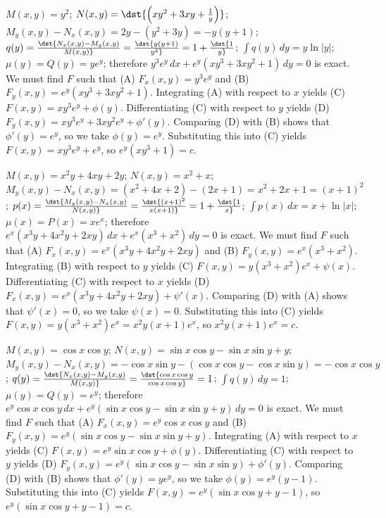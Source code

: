 \documentclass[dvips]{book}
\renewcommand{\exer}[1]{\par\medskip\;\noindent{\color{red}\bf #1.}}
\numberwithin{example}{section}
\numberwithin{equation}{section}
\numberwithin{theorem}{section}
\numberwithin{table}{section}
\numberwithin{figure}{section}
\begin{document}
\exer{2.6.10}
$M(x,y)=y^2$;\;
$N(x,y)= \dst{\left(xy^2+3xy+{1\over y}\right)}$;\;
$M_y(x,y)-N_x(x,y)=2y-(y^2+3y)=-y(y+1)$;\;
$q(y)=\dst{N_x(x,y)-M_y(x,y)\over M(x,y)}=\dst{y(y+1)\over y^2}=
1+\dst{1\over y}$;\;
$\int q(y)\,dy=y\ln|y|$;\;
$\mu(y)=Q(y)=ye^y$;
therefore
$y^3e^y\,dx+e^y(xy^3+3xy^2+1)\,dy=0$
is exact.
We must find $F$ such that
(A) $F_x(x,y)=y^3e^y$ and
(B) $F_y(x,y)=e^y(xy^3+3xy^2+1)$.
Integrating (A) with respect to $x$ yields
(C) $F(x,y)=xy^3e^y+\phi(y)$.
Differentiating (C) with respect to $y$  yields
(D) $F_y(x,y)=xy^3e^y+3xy^2e^y+\phi'(y)$.
Comparing (D) with (B)  shows that
$\phi'(y)=e^y$, so we take
$\phi(y)=e^y$.
Substituting this into (C) yields
$F(x,y)=xy^3e^y+e^y$,
so $e^y(xy^3+1)=c$.




\exer{2.6.12}
$M(x,y)=x^2y+4xy+2y$;\;
$N(x,y)=x^2+x$;\;
$M_y(x,y)-N_x(x,y)=(x^2+4x+2)-(2x+1)=x^2+2x+1=(x+1)^2$;\;
$p(x)=\dst{M_y(x,y)-N_x(x,y)\over N(x,y)}=\dst{(x+1)^2\over
x(x+1)}=1+\dst{1\over x}$;\;
$\int p(x)\,dx=x+\ln|x|$;\;
$\mu(x)=P(x)=xe^x$;
therefore
$e^x(x^3y+4x^2y+2xy)\,dx+e^x(x^3+x^2)\,dy=0$
is exact.
We must find $F$ such that
(A) $F_x(x,y)=e^x(x^3y+4x^2y+2xy)$ and
(B) $F_y(x,y)=e^x(x^3+x^2)$.
Integrating (B) with respect to $y$ yields
(C) $F(x,y)=y(x^3+x^2)e^x+\psi(x)$.
Differentiating (C) with respect to $x$  yields
(D) $F_x(x,y)=e^x(x^3y+4x^2y+2xy)+\psi'(x)$.
Comparing (D) with (A)  shows that
$\psi'(x)=0$, so we take
$\psi(x)=0$.
Substituting this into (C) yields
$F(x,y)=y(x^3+x^2)e^x=x^2y(x+1)e^x$,
so $x^2y(x+1)e^x=c$.



\exer{2.6.14}
$M(x,y)=\cos x\cos y$;\;
$N(x,y)=\sin x\cos y-\sin x\sin y+y$;\;
$M_y(x,y)-N_x(x,y)=-\cos x\sin y-(\cos x\cos y-\cos x\sin y)
=-\cos x\cos y$;\;
$q(y)=\dst{N_x(x,y)-M_y(x,y)\over M(x,y)}=\dst{\cos x\cos y
\over\cos x\cos y}=1$;\;
$\int q(y)\,dy=1$;\;
$\mu(y)=Q(y)=e^y$;
therefore
$e^y\cos x\cos y\,dx+e^y(\sin x\cos y-\sin x\sin y+y)\,dy=0$
is exact.
We must find $F$ such that
(A) $F_x(x,y)=e^y\cos x\cos y$ and
(B) $F_y(x,y)=e^y(\sin x\cos y-\sin x\sin y+y)$.
Integrating (A) with respect to $x$ yields
(C) $F(x,y)=e^y\sin x\cos y+\phi(y)$.
Differentiating (C) with respect to $y$  yields
(D) $F_y(x,y)=e^y(\sin x\cos y-\sin x\sin y)+\phi'(y)$.
Comparing (D) with (B)  shows that
$\phi'(y)=ye^y$, so we take
$\phi(y)=e^y(y-1)$.
Substituting this into (C) yields
$F(x,y)=e^y(\sin x\cos y+y-1)$,
so $e^y(\sin x\cos y+y-1)=c$.
\end{document}
